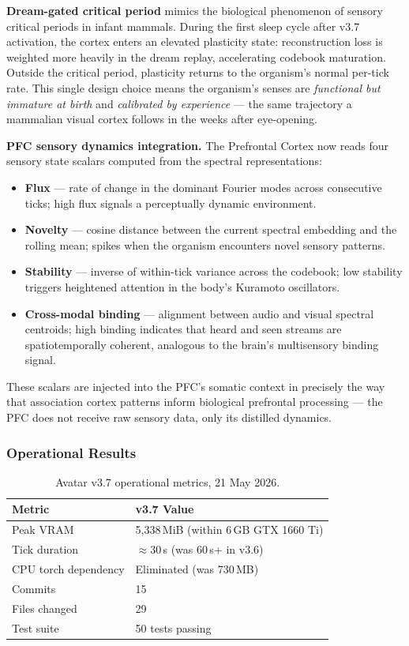 \documentclass[11pt,a4paper]{article}
\begin{document}
\textbf{Dream-gated critical period} mimics the biological phenomenon of sensory
critical periods in infant mammals. During the first sleep cycle after v3.7
activation, the cortex enters an elevated plasticity state: reconstruction loss
is weighted more heavily in the dream replay, accelerating codebook maturation.
Outside the critical period, plasticity returns to the organism's normal per-tick
rate. This single design choice means the organism's senses are \emph{functional
but immature at birth} and \emph{calibrated by experience} --- the same trajectory
a mammalian visual cortex follows in the weeks after eye-opening.

\textbf{PFC sensory dynamics integration.} The Prefrontal Cortex now reads four
sensory state scalars computed from the spectral representations:
\begin{itemize}
  \item \textbf{Flux} --- rate of change in the dominant Fourier modes across
        consecutive ticks; high flux signals a perceptually dynamic environment.
  \item \textbf{Novelty} --- cosine distance between the current spectral embedding
        and the rolling mean; spikes when the organism encounters novel
        sensory patterns.
  \item \textbf{Stability} --- inverse of within-tick variance across the codebook;
        low stability triggers heightened attention in the body's Kuramoto oscillators.
  \item \textbf{Cross-modal binding} --- alignment between audio and visual spectral
        centroids; high binding indicates that heard and seen streams are spatiotemporally
        coherent, analogous to the brain's multisensory binding signal.
\end{itemize}
These scalars are injected into the PFC's somatic context in precisely the way that
association cortex patterns inform biological prefrontal processing --- the PFC does
not receive raw sensory data, only its distilled dynamics.

\subsubsection{Operational Results}

\begin{table}[htbp]
\centering
\caption{Avatar v3.7 operational metrics, 21 May 2026.}
\label{tab:v37metrics}
\begin{tabularx}{\textwidth}{lX}
\toprule
\textbf{Metric} & \textbf{v3.7 Value} \\
\midrule
\rowcolor{lightgray}
Peak VRAM & 5{,}338\,MiB (within 6\,GB GTX 1660 Ti) \\
Tick duration & $\approx$30\,s (was 60\,s+ in v3.6) \\
\rowcolor{lightgray}
CPU torch dependency & Eliminated (was 730\,MB) \\
Commits & 15 \\
\rowcolor{lightgray}
Files changed & 29 \\
Test suite & 50 tests passing \\
\bottomrule
\end{tabularx}
\end{table}
\end{document}

